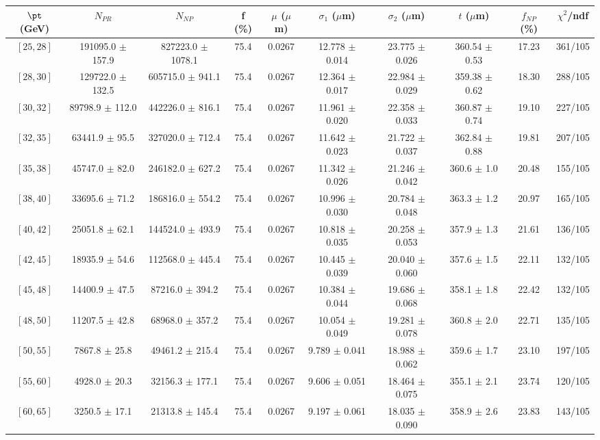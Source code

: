 \begin{tabular}{c||c|c|c|c|c|c|c||c|c}
$\pt$ (GeV) & $N_{PR}$ & $N_{NP}$ & f (\%) & $\mu$ ($\mu$m) & $\sigma_1$ ($\mu$m) & $\sigma_2$ ($\mu$m)  & $t$ ($\mu$m) & $f_{NP}$ (\%) & $\chi^2$/ndf \\
\hline
$[25, 28]$ & 191095.0 $\pm$ 157.9 & 827223.0 $\pm$ 1078.1 & 75.4 & 0.0267 & 12.778 $\pm$ 0.014 & 23.775 $\pm$ 0.026 & 360.54 $\pm$ 0.53 & 17.23 & 361/105\\
$[28, 30]$ & 129722.0 $\pm$ 132.5 & 605715.0 $\pm$ 941.1 & 75.4 & 0.0267 & 12.364 $\pm$ 0.017 & 22.984 $\pm$ 0.029 & 359.38 $\pm$ 0.62 & 18.30 & 288/105\\
$[30, 32]$ & 89798.9 $\pm$ 112.0 & 442226.0 $\pm$ 816.1 & 75.4 & 0.0267 & 11.961 $\pm$ 0.020 & 22.358 $\pm$ 0.033 & 360.87 $\pm$ 0.74 & 19.10 & 227/105\\
$[32, 35]$ & 63441.9 $\pm$ 95.5 & 327020.0 $\pm$ 712.4 & 75.4 & 0.0267 & 11.642 $\pm$ 0.023 & 21.722 $\pm$ 0.037 & 362.84 $\pm$ 0.88 & 19.81 & 207/105\\
$[35, 38]$ & 45747.0 $\pm$ 82.0 & 246182.0 $\pm$ 627.2 & 75.4 & 0.0267 & 11.342 $\pm$ 0.026 & 21.246 $\pm$ 0.042 & 360.6 $\pm$ 1.0 & 20.48 & 155/105\\
$[38, 40]$ & 33695.6 $\pm$ 71.2 & 186816.0 $\pm$ 554.2 & 75.4 & 0.0267 & 10.996 $\pm$ 0.030 & 20.784 $\pm$ 0.048 & 363.3 $\pm$ 1.2 & 20.97 & 165/105\\
$[40, 42]$ & 25051.8 $\pm$ 62.1 & 144524.0 $\pm$ 493.9 & 75.4 & 0.0267 & 10.818 $\pm$ 0.035 & 20.258 $\pm$ 0.053 & 357.9 $\pm$ 1.3 & 21.61 & 136/105\\
$[42, 45]$ & 18935.9 $\pm$ 54.6 & 112568.0 $\pm$ 445.4 & 75.4 & 0.0267 & 10.445 $\pm$ 0.039 & 20.040 $\pm$ 0.060 & 357.6 $\pm$ 1.5 & 22.11 & 132/105\\
$[45, 48]$ & 14400.9 $\pm$ 47.5 & 87216.0 $\pm$ 394.2 & 75.4 & 0.0267 & 10.384 $\pm$ 0.044 & 19.686 $\pm$ 0.068 & 358.1 $\pm$ 1.8 & 22.42 & 132/105\\
$[48, 50]$ & 11207.5 $\pm$ 42.8 & 68968.0 $\pm$ 357.2 & 75.4 & 0.0267 & 10.054 $\pm$ 0.049 & 19.281 $\pm$ 0.078 & 360.8 $\pm$ 2.0 & 22.71 & 135/105\\
$[50, 55]$ & 7867.8 $\pm$ 25.8 & 49461.2 $\pm$ 215.4 & 75.4 & 0.0267 & 9.789 $\pm$ 0.041 & 18.988 $\pm$ 0.062 & 359.6 $\pm$ 1.7 & 23.10 & 197/105\\
$[55, 60]$ & 4928.0 $\pm$ 20.3 & 32156.3 $\pm$ 177.1 & 75.4 & 0.0267 & 9.606 $\pm$ 0.051 & 18.464 $\pm$ 0.075 & 355.1 $\pm$ 2.1 & 23.74 & 120/105\\
$[60, 65]$ & 3250.5 $\pm$ 17.1 & 21313.8 $\pm$ 145.4 & 75.4 & 0.0267 & 9.197 $\pm$ 0.061 & 18.035 $\pm$ 0.090 & 358.9 $\pm$ 2.6 & 23.83 & 143/105\\

\end{tabular}
